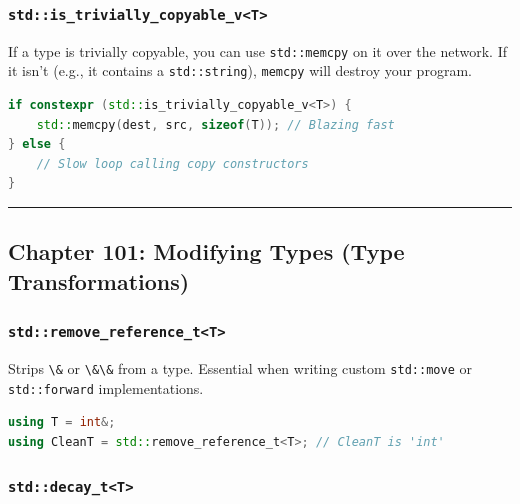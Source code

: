 \hypertarget{stdis_trivially_copyable_vt}{%
\subsubsection{\texorpdfstring{\texttt{std::is\_trivially\_copyable\_v\textless{}T\textgreater{}}}{std::is\_trivially\_copyable\_v\textless T\textgreater{}}}\label{stdis_trivially_copyable_vt}}

If a type is trivially copyable, you can use
\passthrough{\lstinline!std::memcpy!} on it over the network. If it
isn't (e.g., it contains a \passthrough{\lstinline!std::string!}),
\passthrough{\lstinline!memcpy!} will destroy your program.

\begin{lstlisting}[language={C++}]
if constexpr (std::is_trivially_copyable_v<T>) {
    std::memcpy(dest, src, sizeof(T)); // Blazing fast
} else {
    // Slow loop calling copy constructors
}
\end{lstlisting}

\begin{center}\rule{0.5\linewidth}{0.5pt}\end{center}

\hypertarget{chapter-101-modifying-types-type-transformations}{%
\subsection{Chapter 101: Modifying Types (Type
Transformations)}\label{chapter-101-modifying-types-type-transformations}}

\hypertarget{stdremove_reference_tt}{%
\subsubsection{\texorpdfstring{\texttt{std::remove\_reference\_t\textless{}T\textgreater{}}}{std::remove\_reference\_t\textless T\textgreater{}}}\label{stdremove_reference_tt}}

Strips \passthrough{\lstinline!\&!} or \passthrough{\lstinline!\&\&!}
from a type. Essential when writing custom
\passthrough{\lstinline!std::move!} or
\passthrough{\lstinline!std::forward!} implementations.

\begin{lstlisting}[language={C++}]
using T = int&;
using CleanT = std::remove_reference_t<T>; // CleanT is 'int'
\end{lstlisting}

\hypertarget{stddecay_tt}{%
\subsubsection{\texorpdfstring{\texttt{std::decay\_t\textless{}T\textgreater{}}}{std::decay\_t\textless T\textgreater{}}}\label{stddecay_tt}}


